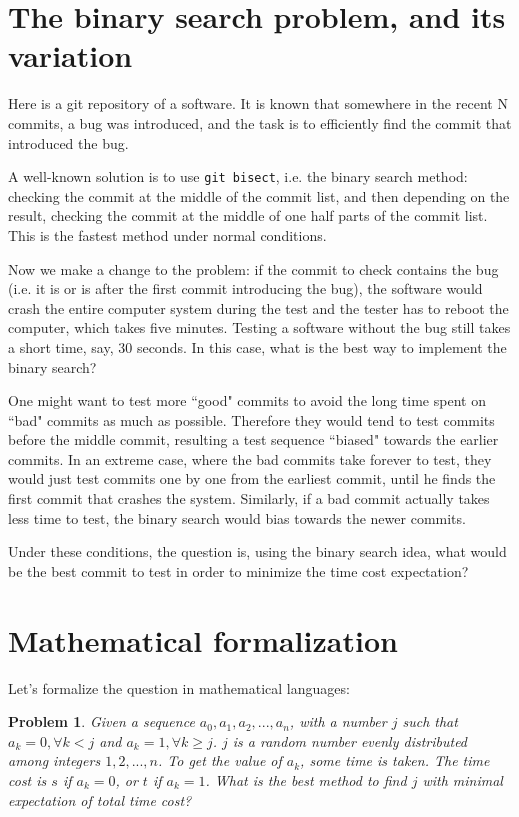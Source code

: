 \documentclass[]{article}
\begin{document}
\newtheorem{problem}{Problem}
\newtheorem{lemma}{Property}

\section{The binary search problem, and its variation}

Here is a git repository of a software. It is known that somewhere in the recent N commits, a bug was introduced, and the task is to efficiently find the commit that introduced the bug.

A well-known solution is to use \texttt{git bisect}, i.e. the binary search method: checking the commit at the middle of the commit list, and then depending on the result, checking the commit at the middle of one half parts of the commit list. This is the fastest method under normal conditions.

Now we make a change to the problem: if the commit to check contains the bug (i.e. it is or is after the first commit introducing the bug), the software would crash the entire computer system during the test and the tester has to reboot the computer, which takes five minutes. Testing a software without the bug still takes a short time, say, 30 seconds. In this case, what is the best way to implement the binary search?

One might want to test more ``good" commits to avoid the long time spent on ``bad" commits as much as possible. Therefore they would tend to test commits before the middle commit, resulting a test sequence ``biased" towards the earlier commits. In an extreme case, where the bad commits take forever to test, they would just test commits one by one from the earliest commit, until he finds the first commit that crashes the system. Similarly, if a bad commit actually takes less time to test, the binary search would bias towards the newer commits.

Under these conditions, the question is, using the binary search idea, what would be the best commit to test in order to minimize the time cost expectation?

\section{Mathematical formalization}

Let's formalize the question in mathematical languages:

\begin{problem}
	Given a sequence $a_0, a_1, a_2, ..., a_n$, with a number $j$ such that $a_k = 0, \forall k < j$ and $a_k = 1, \forall k \ge j$. $j$ is a random number evenly distributed among integers $1, 2, ..., n$. To get the value of $a_k$, some time is taken. The time cost is $s$ if $a_k = 0$, or $t$ if $a_k = 1$. What is the best method to find $j$ with minimal expectation of total time cost?
\end{problem}
\end{document}
